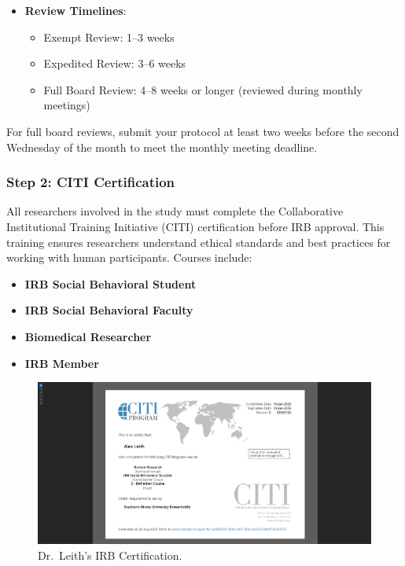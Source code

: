 \documentclass[
]{book}
\providecommand{\tightlist}{%
  \setlength{\itemsep}{0pt}\setlength{\parskip}{0pt}}
\begin{document}
\begin{itemize}
\tightlist
\item
  \textbf{Review Timelines}:

  \begin{itemize}
  \tightlist
  \item
    Exempt Review: 1--3 weeks
  \item
    Expedited Review: 3--6 weeks
  \item
    Full Board Review: 4--8 weeks or longer (reviewed during monthly meetings)
  \end{itemize}
\end{itemize}

For full board reviews, submit your protocol at least two weeks before the second Wednesday of the month to meet the monthly meeting deadline.

\subsubsection*{Step 2: CITI Certification}\label{step-2-citi-certification}

All researchers involved in the study must complete the Collaborative Institutional Training Initiative (CITI) certification before IRB approval. This training ensures researchers understand ethical standards and best practices for working with human participants. Courses include:

\begin{itemize}
\tightlist
\item
  \textbf{IRB Social Behavioral Student}
\item
  \textbf{IRB Social Behavioral Faculty}
\item
  \textbf{Biomedical Researcher}
\item
  \textbf{IRB Member}
\end{itemize}

\begin{figure}
\centering
\includegraphics[width=1\linewidth,height=\textheight,keepaspectratio]{images/irb-cert.png}
\caption{Dr.~Leith's IRB Certification.}
\end{figure}
\end{document}
